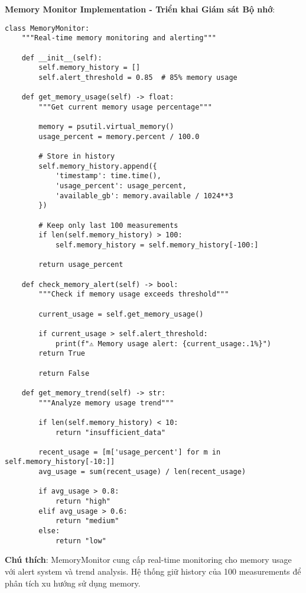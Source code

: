 \textbf{Memory Monitor Implementation - Triển khai Giám sát Bộ nhớ}:

\begin{verbatim}
class MemoryMonitor:
    """Real-time memory monitoring and alerting"""
    
    def __init__(self):
        self.memory_history = []
        self.alert_threshold = 0.85  # 85% memory usage
        
    def get_memory_usage(self) -> float:
        """Get current memory usage percentage"""
        
        memory = psutil.virtual_memory()
        usage_percent = memory.percent / 100.0
        
        # Store in history
        self.memory_history.append({
            'timestamp': time.time(),
            'usage_percent': usage_percent,
            'available_gb': memory.available / 1024**3
        })
        
        # Keep only last 100 measurements
        if len(self.memory_history) > 100:
            self.memory_history = self.memory_history[-100:]
            
        return usage_percent
        
    def check_memory_alert(self) -> bool:
        """Check if memory usage exceeds threshold"""
        
        current_usage = self.get_memory_usage()
        
        if current_usage > self.alert_threshold:
            print(f"⚠️ Memory usage alert: {current_usage:.1%}")
        return True
        
        return False

    def get_memory_trend(self) -> str:
        """Analyze memory usage trend"""
        
        if len(self.memory_history) < 10:
            return "insufficient_data"
            
        recent_usage = [m['usage_percent'] for m in self.memory_history[-10:]]
        avg_usage = sum(recent_usage) / len(recent_usage)
        
        if avg_usage > 0.8:
            return "high"
        elif avg_usage > 0.6:
            return "medium"
        else:
            return "low"
\end{verbatim}

\textbf{Chú thích}: MemoryMonitor cung cấp real-time monitoring cho memory usage với alert system và trend analysis. Hệ thống giữ history của 100 measurements để phân tích xu hướng sử dụng memory.

